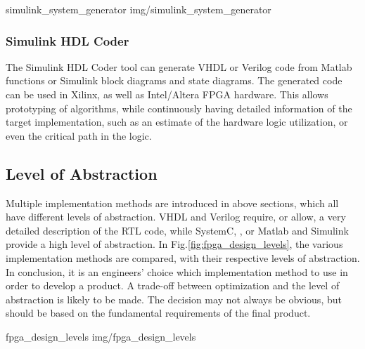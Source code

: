  {simulink_system_generator} {img/simulink_system_generator}

\subsubsection{Simulink HDL Coder}

The Simulink HDL Coder tool can generate VHDL or Verilog code from Matlab functions or Simulink block diagrams and state diagrams.
The generated code can be used in Xilinx, as well as Intel/Altera FPGA hardware.
This allows prototyping of algorithms, while continuously having detailed information of the target implementation, such as an estimate of the hardware logic utilization, or even the critical path in the logic.

\subsection{Level of Abstraction}

Multiple implementation methods are introduced in above sections, which all have different levels of abstraction.
VHDL and Verilog require, or allow, a very detailed description of the RTL code, while SystemC, \cplusplus, or Matlab and Simulink provide a high level of abstraction.
In Fig.\ref{fig:fpga_design_levels}, the various implementation methods are compared, with their respective levels of abstraction.\\

In conclusion, it is an engineers' choice which implementation method to use in order to develop a product.
A trade-off between optimization and the level of abstraction is likely to be made.
The decision may not always be obvious, but should be based on the fundamental requirements of the final product.

 {fpga_design_levels} {img/fpga_design_levels}

